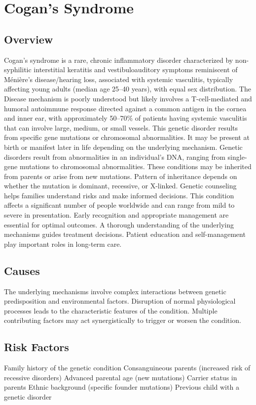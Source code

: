 \chapter{Cogan's Syndrome}
\label{sec:Cogan's Syndrome}

\section{Overview}
Cogan's syndrome is a rare, chronic inflammatory disorder characterized by non-syphilitic interstitial keratitis and vestibuloauditory symptoms reminiscent of Ménière's disease/hearing loss, associated with systemic vasculitis, typically affecting young adults (median age 25--40 years), with equal sex distribution. The Disease mechanism is poorly understood but likely involves a T-cell-mediated and humoral autoimmune response directed against a common antigen in the cornea and inner ear, with approximately 50--70\% of patients having systemic vasculitis that can involve large, medium, or small vessels. This genetic disorder results from specific gene mutations or chromosomal abnormalities. It may be present at birth or manifest later in life depending on the underlying mechanism. Genetic disorders result from abnormalities in an individual's DNA, ranging from single-gene mutations to chromosomal abnormalities. These conditions may be inherited from parents or arise from new mutations. Pattern of inheritance depends on whether the mutation is dominant, recessive, or X-linked. Genetic counseling helps families understand risks and make informed decisions. This condition affects a significant number of people worldwide and can range from mild to severe in presentation. Early recognition and appropriate management are essential for optimal outcomes. A thorough understanding of the underlying mechanisms guides treatment decisions. Patient education and self-management play important roles in long-term care.
\section{Causes}
The underlying mechanisms involve complex interactions between genetic predisposition and environmental factors. Disruption of normal physiological processes leads to the characteristic features of the condition. Multiple contributing factors may act synergistically to trigger or worsen the condition.
\section{Risk Factors}
Family history of the genetic condition Consanguineous parents (increased risk of recessive disorders) Advanced parental age (new mutations) Carrier status in parents Ethnic background (specific founder mutations) Previous child with a genetic disorder

